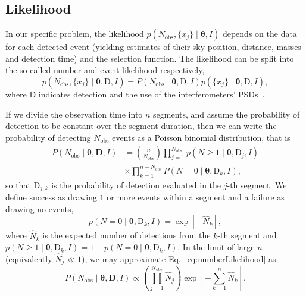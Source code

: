\documentclass[usenatbib,useAMS]{mnras}
\newcommand{\Nobs}{\ensuremath{N_\mathrm{obs}}}
\begin{document}
\subsection{Likelihood}\label{subsec:likelihood}
In our specific problem, the likelihood $p(\Nobs,\{x_j\} \mid \bm{\theta},I)$
depends on the data for each detected event (yielding estimates of their sky
position, distance, masses and detection time) and the selection function. The
likelihood can be split into the so-called number and event likelihood
respectively,
%
\begin{equation}\label{eq:likelihood}
	p \left(\Nobs, \{x_j\} \mid \bm{\theta}, \bm{\mathrm{D}}, I\right)
	=
	P\left(\Nobs \mid \bm{\theta},  \bm{\mathrm{D}} , I\right)
	p\left(\{x_j\} \mid \bm{\theta}, \bm{\mathrm{D}}, I\right),
\end{equation}
%
where $\bm{\mathrm{D}}$ indicates detection and the use of the
interferometers' \acp{PSD}~\citep{2018arXiv180902063M}.

If we divide the observation time into $n$ segments, and assume the probability
of detection to be constant over the segment duration, then we can write the
probability of detecting $\Nobs$ events as a Poisson binomial distribution,
that is
% 
\begin{equation}\label{eq:numberLikelihood}
    \begin{split}
        P\left( \Nobs \mid \bm{\theta}, \bm{D}, I\right)
        &=
        \binom{n}{\Nobs} \prod_{j=1}^{\Nobs}
        p\left(N \geq 1 \mid \bm{\theta}, \bm{\mathrm{D}}_j, I\right)\\
        &\times
        \prod_{k=1}^{n - \Nobs}
        P\left(N = 0 \mid \bm{\theta}, \bm{\mathrm{D}}_k, I\right),
    \end{split}
\end{equation}
%
so that $\bm{\mathrm{D}}_{j, k}$ is the probability of detection evaluated in the
$j$-th segment. We define success as drawing $1$ or more events within
a segment and a failure as drawing no events,
%
\begin{equation}
    p\left(N = 0 \mid \bm{\theta}, \bm{\mathrm{D}}_k, I\right)
    =
    \exp\left[-\hat{N}_k\right],
\end{equation}
%
where $\hat{N}_k$ is the expected number of detections from the $k$-th segment
and 
$p\left(N \geq 1 \mid \bm{\theta}, \bm{\mathrm{D}}_k, I\right)
=
1 - p\left(N = 0 \mid \bm{\theta}, \bm{\mathrm{D}}_k, I\right)$.
In the limit of large $n$ (equivalently $\hat{N}_j \ll 1$),
we may approximate Eq.~\eqref{eq:numberLikelihood} as
%
\begin{equation}\label{eq:simplified_likelihood}
    P\left( \Nobs \mid \bm{\theta}, \bm{D}, I\right)
    \propto
    \left(\prod_{j=1}^{\Nobs} \hat{N}_j \right)
    \exp \left[ - \sum_{k=1}^{n} \hat{N}_k \right].
\end{equation}
\end{document}
